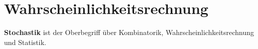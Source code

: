 \part{Wahrscheinlichkeitsrechnung}

\textbf{Stochastik} ist der Oberbegriff über
Kombinatorik, Wahrscheinlichkeitsrechnung und Statistik.

\renewcommand{\bbwPartID}{STOCH}









\newpage
